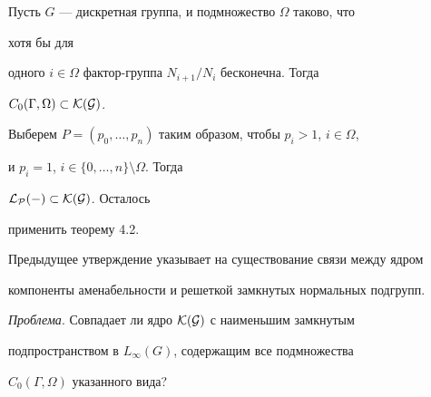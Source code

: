 \begin{cors}


Пусть $G$ --- дискретная группа, и подмножество $\Omega$ таково, что


хотя бы для


одного $i\in\Omega$ фактор-группа $N_{i+1}/N_i$ бесконечна. Тогда


$C_0(\Gamma,\Omega)\subset\cal K(G)$.


\end{cors}





\begin{pf}


Выберем $P=(p_0,\dotsc,p_n)$ таким образом, чтобы $p_i>1$, $i\in\Omega$,


и $p_i=1$, $i\in\{0,\dotsc,n\}\setminus\Omega$. Тогда


$\cal L_P(\Gamma)\subset\cal K(G)$. Осталось


применить теорему 4.2.


\end{pf}





Предыдущее утверждение указывает на существование связи между ядром


компоненты аменабельности и решеткой замкнутых нормальных подгрупп.


\medskip





{\it Проблема}. Совпадает ли ядро $\cal K(G)$ с наименьшим замкнутым


подпространством в $L_\infty(G)$, содержащим все подмножества


$C_0(\Gamma,\Omega)$ указанного вида?








